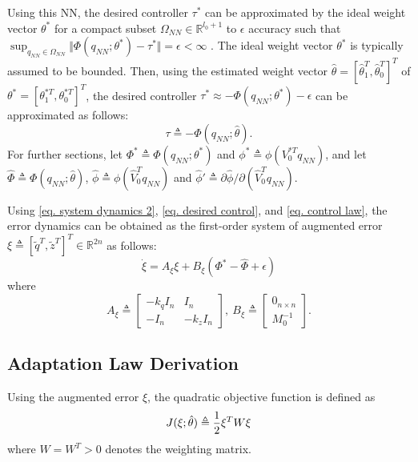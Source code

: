 \documentclass[letterpaper, 10 pt, conference]{ieeeconf}  %
\begin{document}
Using this NN, the desired controller $\tau^*$ can be approximated by the ideal weight vector $\theta^*$ for a compact subset $\Omega_{NN}\in\mathbb R^{l_0+1}$ to $\epsilon$ accuracy such that $\sup_{{q_{NN}}\in\Omega_{NN}} \Vert\Phi({q_{NN}};\theta^*) - \tau^*\Vert=\epsilon<\infty$ \cite{RN35}.
The ideal weight vector $\theta^*$ is typically assumed to be bounded.
Then, using the estimated weight vector $\hat\theta=[\hat\theta_1^T,\hat\theta_0^T]^T$ of $\theta^*=[\theta_1^{*T},\theta_0^{*T}]^T$, the desired controller $\tau^*\approx -\Phi(q_{NN};\theta^*)-\epsilon$ can be approximated as follows:
\begin{equation}
    \tau \triangleq -\Phi({q_{NN}};\hat\theta).
    \label{eq. control law}
\end{equation}
For further sections, let $\Phi^*\triangleq\Phi({q_{NN}};\theta^*)$ and $\phi^* \triangleq\phi(V_0^{*T}{q_{NN}})$, and let $\hat\Phi\triangleq\Phi({q_{NN}};\hat\theta)$, $\hat\phi \triangleq\phi(\hat V_0^{T}{q_{NN}})$ and $\hat\phi' \triangleq \partial \hat\phi/\partial (\hat V_0^Tq_{NN})$.

Using \eqref{eq. system dynamics 2}, \eqref{eq. desired control}, and \eqref{eq. control law}, the error dynamics can be obtained as the first-order system of augmented error $\xi\triangleq[\tilde q^T,\tilde z^T]^T\in\mathbb R^{2n}$ as follows:
\begin{equation*}
    \dot\xi = A_\xi\xi+B_\xi(\Phi^*-\hat\Phi+\epsilon)
\end{equation*}
where 
\begin{equation*}
    A_\xi \triangleq 
    \begin{bmatrix}
        -{k_q} I_n &I_n\\-I_n& -{k_z} I_n
    \end{bmatrix}
    ,\ 
    B_\xi \triangleq 
    \begin{bmatrix}
        0_{n\times n}\\M_0^{-1}
    \end{bmatrix}.
\end{equation*}

\subsection{Adaptation Law Derivation}\label{sec:adap_laws}

Using the augmented error $\xi$, the quadratic objective function is defined as
\begin{equation*}
    J(\xi;\hat\theta)\triangleq
    {1\over 2}
    \xi^TW\xi
\end{equation*}
where $W=W^T>0$ denotes the weighting matrix.
\end{document}
